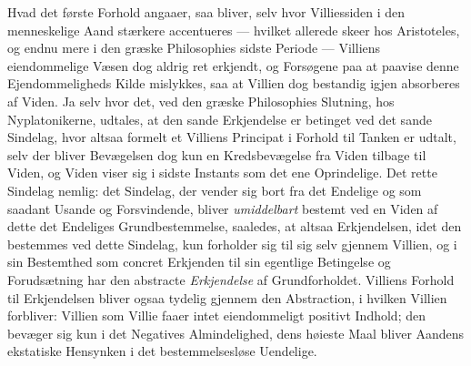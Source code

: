 \documentclass[12pt,a4paper]{book}
\newcommand{\opage}[1]{\marginnote{\footnotesize\textit{[#1]}}}
\begin{document}
Hvad det første Forhold angaaer, saa bliver, selv hvor Villiessiden i
den menneskelige Aand stærkere accentueres --- hvilket allerede skeer
hos Aristoteles, og endnu mere i den græske Philosophies sidste
Periode --- Villiens eiendommelige Væsen dog aldrig ret erkjendt, og
Forsøgene paa at paavise denne Ejendommeligheds Kilde mislykkes, saa
at Villien dog bestandig igjen absorberes af Viden. Ja selv hvor det,
ved den græske Philosophies Slutning, hos Nyplatonikerne, udtales, at
den sande Erkjendelse er betinget ved det sande Sindelag, hvor altsaa
formelt et Villiens Principat i Forhold til Tanken er udtalt, selv der
bliver Bevægelsen dog kun en Kredsbevægelse fra Viden tilbage til
Viden, og Viden viser sig i sidste Instants som det ene Oprindelige.
Det rette Sindelag nemlig: det Sindelag, der vender sig bort fra det
Endelige og som saadant Usande og Forsvindende, bliver \emph{umiddelbart} bestemt ved en Viden af dette det Endeliges Grundbestemmelse, saaledes,
at altsaa Erkjendelsen, \opage{13}idet den bestemmes ved dette Sindelag, kun
forholder sig til sig selv gjennem Villien, og i sin Bestemthed som
concret Erkjenden til sin egentlige Betingelse og Forudsætning har den abstracte \emph{Erkjendelse} af Grundforholdet. Villiens Forhold til
Erkjendelsen bliver ogsaa tydelig gjennem den Abstraction, i hvilken
Villien forbliver: Villien som Villie faaer intet eiendommeligt
positivt Indhold; den bevæger sig kun i det Negatives Almindelighed,
dens høieste Maal bliver Aandens ekstatiske Hensynken i det
bestemmelsesløse Uendelige.
\end{document}
